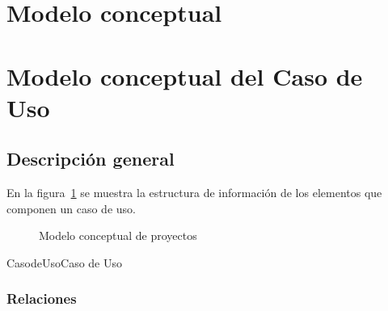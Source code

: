 \section{Modelo conceptual}
\section{Modelo conceptual del Caso de Uso}

\subsection{Descripción general}
En la figura~\ref{fig:conceptualProyectos} se muestra la estructura de información de los elementos que componen un caso de uso.
 
\begin{figure}[htbp!]
	\begin{center}
		\caption{Modelo conceptual de proyectos}
		\label{fig:conceptualProyectos}
	\end{center}
\end{figure}



\begin{BusinessEntity}{CasodeUso}{Caso de Uso}
\end{BusinessEntity}

\subsubsection{Relaciones}

